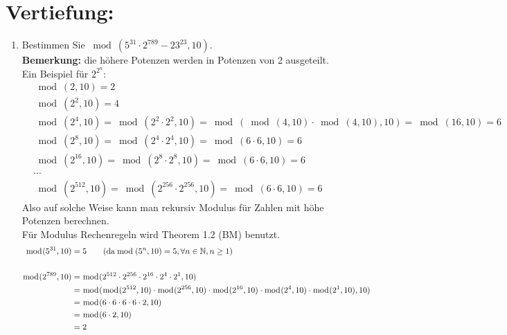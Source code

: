 



	\maketitle
	\section*{Vertiefung:}
	\begin{enumerate}[label=(\alph*)]
		\item  Bestimmen Sie $ \bmod(5^{31} \cdot 2^{789}-23^{23}, 10) $. \\
		\textbf{Bemerkung:} die h\"ohere Potenzen werden in Potenzen von 2 ausgeteilt.\\ Ein Beispiel f\"ur $2^{2^n}$:
		\begin{align*}
			&\bmod(2,10)=2\\
			&\bmod(2^2,10)=4\\
			&\bmod(2^4,10)=\bmod(2^2\cdot2^2,10)=\bmod(\bmod(4,10)\cdot\bmod(4,10),10)=\bmod(16,10)=6\\
			&\bmod(2^8,10)=\bmod(2^4\cdot2^4,10)=\bmod(6\cdot6,10)=6\\
			&\bmod(2^{16},10)=\bmod(2^8\cdot2^8,10)=\bmod(6\cdot6,10)=6\\
			&\cdots \\
			&\bmod(2^{512},10)=\bmod(2^{256}\cdot2^{256},10)=\bmod(6\cdot6,10)=6
		\end{align*}
		Also auf solche Weise kann man rekursiv Modulus f\"ur Zahlen mit h\"ohe Potenzen berechnen.\\
		F\"ur Modulus Rechenregeln wird Theorem 1.2 (BM) benutzt. 
		\begin{align*}
			\bmod(5^{31},10) &= 5  \textrm{\qquad (da} \bmod(5^n,10)=5, \forall n \in \mathbb{N}, n\geq1) \\\\
			\bmod(2^{789},10) &= \bmod(2^{512}\cdot2^{256}\cdot2^{16}\cdot2^4\cdot2^1,10) 
			\\&= \bmod(\bmod(2^{512},10)\cdot\bmod(2^{256},10)\cdot\bmod(2^{16},10)\cdot\bmod(2^4,10)\cdot\bmod(2^1,10),10)
			\\&= \bmod(6\cdot 6\cdot 6\cdot 6\cdot 2, 10)
			\\&= \bmod(6\cdot2,10) 
			\\&= 2 \\\\

\end{align*}
\end{enumerate}
